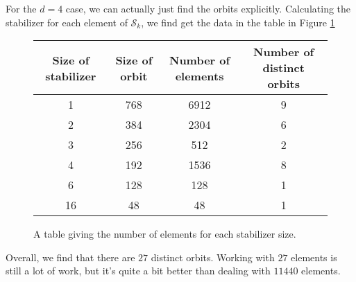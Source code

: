 For the $d=4$ case, we can actually just find the orbits explicitly. Calculating the stabilizer for each element of $\mathcal{S}_k$, we find get the data in the table in Figure \ref{fig:table2}

\begin{figure}
\begin{center}
\begin{tabular}{ | c | c | c | c |} 
\hline
 Size of stabilizer & Size of orbit & Number of elements & Number of distinct orbits \\ 
\hline
1 & 768 & 6912 & 9\\ 
\hline
2 & 384 & 2304 & 6\\ 
\hline
3 & 256 & 512 & 2 \\ 
\hline
4 & 192 & 1536 & 8 \\ 
\hline
6 & 128 & 128 & 1 \\ 
\hline
16 & 48 & 48 & 1 \\ 
\hline
\end{tabular}
\end{center}
\caption{A table giving the number of elements for each stabilizer size.} \label{fig:table2}
\end{figure}

Overall, we find that there are $27$ distinct orbits. Working with $27$ elements is still a lot of work, but it's quite a bit better than dealing with $11440$ elements.